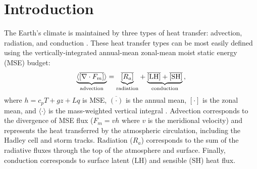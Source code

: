 \documentclass{ametsocV5}
\begin{document}




\section{Introduction}

The Earth's climate is maintained by three types of heat transfer: advection, radiation, and conduction \citep{hartmann2016}. These heat transfer types can be most easily defined using the vertically-integrated annual-mean zonal-mean moist static energy (MSE) budget:
\begin{equation} \label{eq:mse-ann}
    {\underbrace{\langle \overline{[\nabla\cdot F_{m}]}\rangle}_{\text{advection}}} = {\underbrace{\vphantom{\nabla\cdot \langle [F_{m}]\rangle} \overline{[R_{a}]}}_\text{radiation}} + {\underbrace{\vphantom{\nabla\cdot \langle [F_{m}]\rangle} \mathrm{\overline{[LH]}+\overline{[SH]}}}_\text{conduction}} \, ,
\end{equation}
where $h=c_p T + gz + Lq$ is MSE, $\overline{(\cdot)}$ is the annual mean, $[\cdot]$ is the zonal mean, and $\langle \cdot \rangle$ is the mass-weighted vertical integral \citep{neelin1987}. Advection corresponds to the divergence of MSE flux ($F_m=vh$ where $v$ is the meridional velocity) and represents the heat transferred by the atmospheric circulation, including the Hadley cell and storm tracks. Radiation ($R_a$) corresponds to the sum of the radiative fluxes through the top of the atmosphere and surface. Finally, conduction corresponds to surface latent ($\mathrm{LH}$) and sensible ($\mathrm{SH}$) heat flux.
\end{document}
